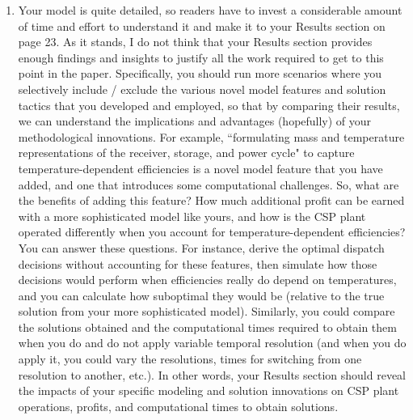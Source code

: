 \documentclass[10pt]{article}
\begin{document}
\begin{enumerate}
  


\item Your model is quite detailed, so readers have to invest a considerable
amount of time and effort to understand it and make it to your Results section
on page 23. As it stands, I do not think that your Results section provides
enough findings and insights to justify all the work required to get to this
point in the paper. Specifically, you should run more scenarios where you
selectively include / exclude the various novel model features and solution
tactics that you developed and employed, so that by comparing their results, we
can understand the implications and advantages (hopefully) of your
methodological innovations. For example,  ``formulating mass and temperature
representations of the receiver, storage, and power cycle" to capture
temperature-dependent efficiencies is a novel model feature that you have
added, and one that introduces some computational challenges. So, what are the
benefits of adding this feature? How much additional profit can be earned with
a more sophisticated model like yours, and how is the CSP plant operated
differently when you account for temperature-dependent efficiencies? You can
answer these questions. For instance, derive the optimal dispatch decisions
without accounting for these features, then simulate how those decisions would
perform when efficiencies really do depend on temperatures, and you can
calculate how suboptimal they would be (relative to the true solution from your
more sophisticated model). Similarly, you could compare the solutions obtained
and the computational times required to obtain them when you do and do
not apply variable temporal resolution (and when you do apply it, you could
vary the resolutions, times for switching from one resolution to another,
etc.). In other words, your Results section should reveal the impacts of your
specific modeling and solution innovations on CSP plant operations, profits,
and computational times to obtain solutions.


\end{enumerate}
\end{document}
